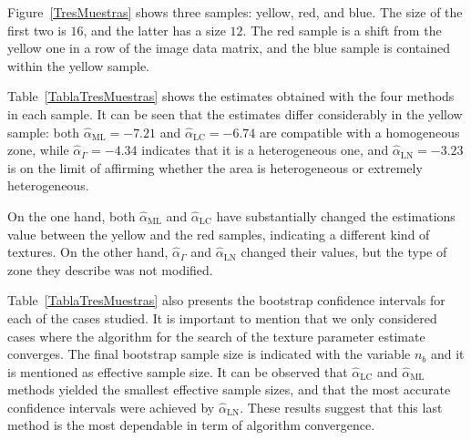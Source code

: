 \documentclass[twocolumn]{svjour3}
\begin{document}
Figure~\ref{TresMuestras} shows three samples: yellow, red, and blue. 
The size of the first two is $16$, and the latter has a size $12$. 
The red sample is a shift from the yellow one in a row of the image data matrix, and the blue sample is contained within the yellow sample.

Table~\ref{TablaTresMuestras} shows the estimates obtained with the four methods in each sample. 
It can be seen that the estimates differ considerably in the yellow sample: 
both $\widehat{\alpha}_{\text{{ML}}}=-7.21$ and $\widehat{\alpha}_{\text{{LC}}}=-6.74$ are compatible with a homogeneous zone, while $\widehat{\alpha}_{\Gamma}=-4.34$ indicates that it is a heterogeneous one, and $\widehat{\alpha}_{\text{{LN}}}=-3.23$ is on the limit of affirming whether the area is heterogeneous or extremely heterogeneous.

On the one hand, both $\widehat{\alpha}_{\text{{ML}}}$ and $\widehat{\alpha}_{\text{{LC}}}$ have substantially changed the estimations value between the yellow and the red samples, indicating a different kind of textures. 
On the other hand, $\widehat{\alpha}_{\Gamma}$ and $\widehat{\alpha}_{\text{{LN}}}$ changed their values, but the type of zone they describe was not modified.

Table~\ref{TablaTresMuestras} also presents the bootstrap confidence intervals for each of the cases studied. 
It is important to mention that we only considered cases where the algorithm for the search of the texture parameter estimate converges. 
The final bootstrap sample size is indicated with the variable $n_b$ and it is mentioned as effective sample size.  
It can be observed that $\widehat{\alpha}_{\text{{LC}}}$ and $\widehat{\alpha}_{\text{{ML}}}$ methods yielded the smallest effective sample sizes, and that the most accurate confidence intervals were achieved by $\widehat{\alpha}_{\text{{LN}}}$.
These results suggest that this last method is the most dependable in term of algorithm convergence. 
\end{document}
